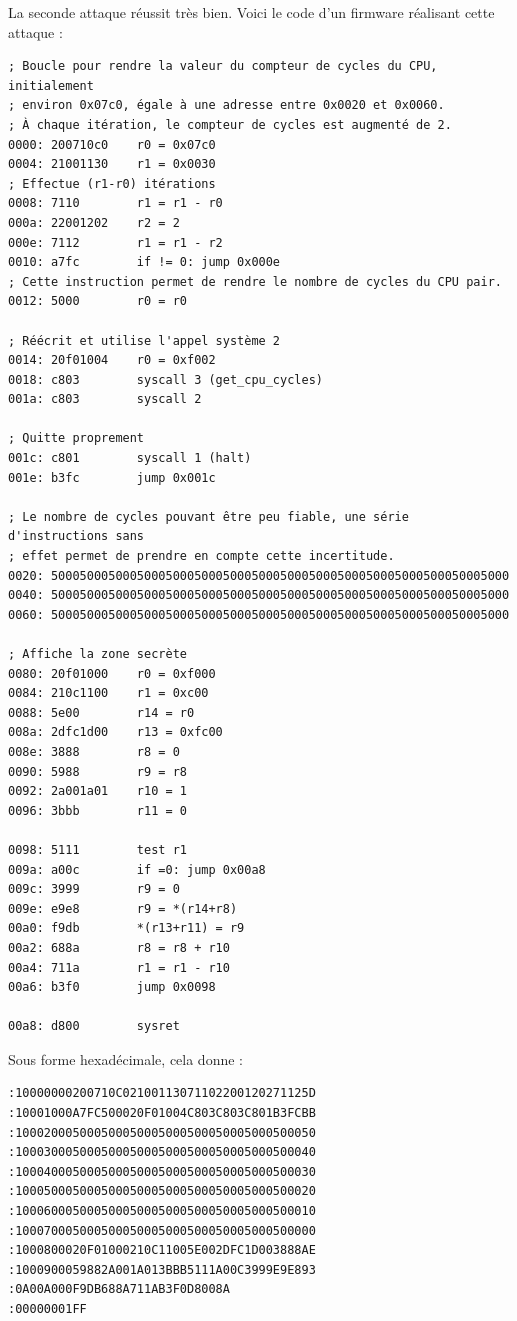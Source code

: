 \documentclass[a4paper,10pt]{article}
\begin{document}
La seconde attaque réussit très bien. Voici le code d'un firmware réalisant cette attaque :
\begin{verbatim}
; Boucle pour rendre la valeur du compteur de cycles du CPU, initialement
; environ 0x07c0, égale à une adresse entre 0x0020 et 0x0060.
; À chaque itération, le compteur de cycles est augmenté de 2.
0000: 200710c0    r0 = 0x07c0
0004: 21001130    r1 = 0x0030
; Effectue (r1-r0) itérations
0008: 7110        r1 = r1 - r0
000a: 22001202    r2 = 2
000e: 7112        r1 = r1 - r2
0010: a7fc        if != 0: jump 0x000e
; Cette instruction permet de rendre le nombre de cycles du CPU pair.
0012: 5000        r0 = r0

; Réécrit et utilise l'appel système 2
0014: 20f01004    r0 = 0xf002
0018: c803        syscall 3 (get_cpu_cycles)
001a: c803        syscall 2

; Quitte proprement
001c: c801        syscall 1 (halt)
001e: b3fc        jump 0x001c

; Le nombre de cycles pouvant être peu fiable, une série d'instructions sans
; effet permet de prendre en compte cette incertitude.
0020: 5000500050005000500050005000500050005000500050005000500050005000
0040: 5000500050005000500050005000500050005000500050005000500050005000
0060: 5000500050005000500050005000500050005000500050005000500050005000

; Affiche la zone secrète
0080: 20f01000    r0 = 0xf000
0084: 210c1100    r1 = 0xc00
0088: 5e00        r14 = r0
008a: 2dfc1d00    r13 = 0xfc00
008e: 3888        r8 = 0
0090: 5988        r9 = r8
0092: 2a001a01    r10 = 1
0096: 3bbb        r11 = 0

0098: 5111        test r1
009a: a00c        if =0: jump 0x00a8
009c: 3999        r9 = 0
009e: e9e8        r9 = *(r14+r8)
00a0: f9db        *(r13+r11) = r9
00a2: 688a        r8 = r8 + r10
00a4: 711a        r1 = r1 - r10
00a6: b3f0        jump 0x0098

00a8: d800        sysret
\end{verbatim}

Sous forme hexadécimale, cela donne :
\begin{verbatim}
:10000000200710C02100113071102200120271125D
:10001000A7FC500020F01004C803C803C801B3FCBB
:100020005000500050005000500050005000500050
:100030005000500050005000500050005000500040
:100040005000500050005000500050005000500030
:100050005000500050005000500050005000500020
:100060005000500050005000500050005000500010
:100070005000500050005000500050005000500000
:1000800020F01000210C11005E002DFC1D003888AE
:1000900059882A001A013BBB5111A00C3999E9E893
:0A00A000F9DB688A711AB3F0D8008A
:00000001FF
\end{verbatim}
\end{document}
